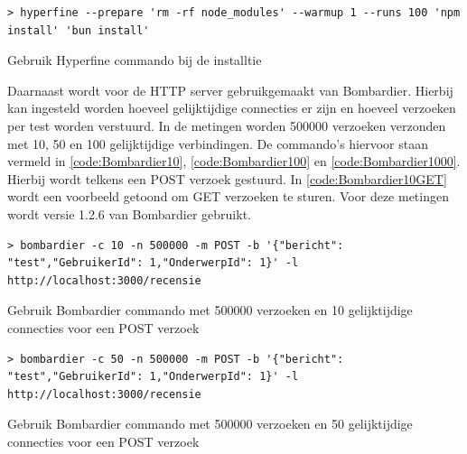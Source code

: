 \begin{listing}[H]
  \centering
  \begin{verbatim}
> hyperfine --prepare 'rm -rf node_modules' --warmup 1 --runs 100 'npm install' 'bun install'
      \end{verbatim}
      \caption[Gebruik Hyperfine bij de installatie]{\label{code:HyperfineInstall}Gebruik Hyperfine commando bij de installtie}
\end{listing}
Daarnaast wordt voor de HTTP server gebruikgemaakt van Bombardier. 
Hierbij kan ingesteld worden hoeveel gelijktijdige connecties er zijn en hoeveel verzoeken per test worden verstuurd.
In de metingen worden 500000 verzoeken verzonden met 10, 50 en 100 gelijktijdige verbindingen.
De commando's hiervoor staan vermeld in \ref{code:Bombardier10}, \ref{code:Bombardier100} en \ref{code:Bombardier1000}.
Hierbij wordt telkens een POST verzoek gestuurd. In \ref{code:Bombardier10GET} wordt een voorbeeld getoond om GET verzoeken te sturen.
Voor deze metingen wordt versie 1.2.6 van Bombardier gebruikt.
\begin{listing}[H]
  \centering
  \begin{verbatim}
> bombardier -c 10 -n 500000 -m POST -b '{"bericht": "test","GebruikerId": 1,"OnderwerpId": 1}' -l http://localhost:3000/recensie
      \end{verbatim}
      \caption[Gebruik Bombardier POST verzoek met 10 connecties]{\label{code:Bombardier10}Gebruik Bombardier commando met 500000 verzoeken en 10 gelijktijdige connecties voor een POST verzoek}
\end{listing}
\begin{listing}[H]
  \centering
  \begin{verbatim}
> bombardier -c 50 -n 500000 -m POST -b '{"bericht": "test","GebruikerId": 1,"OnderwerpId": 1}' -l http://localhost:3000/recensie
      \end{verbatim}
      \caption[Gebruik Bombardier POST verzoek met 50 connecties]{\label{code:Bombardier100}Gebruik Bombardier commando met 500000 verzoeken en 50 gelijktijdige connecties voor een POST verzoek}
\end{listing}
